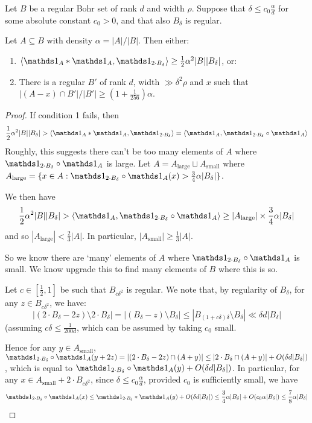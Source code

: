 \documentclass[10pt,a4paper]{article}
\begin{document}
\begin{lemma}
  Let $B$ be a regular Bohr set of rank $d$ and width $\rho$. Suppose that $\delta \leq c_0 \frac{\alpha}{d}$ for some absolute constant $c_0 > 0$, and that also $B_\delta$ is regular.

  Let $A \subseteq B$ with density $\alpha = |A|/|B|$. Then either:
  \begin{enumerate}
    \item $\angle{\one_A \ast \one_A, \one_{2\cdot B_\delta}} \geq \frac12 \alpha^2 |B||B_\delta|$, or:
    \item There is a regular $B'$ of rank $d$, width $\gg \delta^2 \rho$ and $x$ such that $|(A-x)\cap B'|/|B'| \geq (1+\frac{1}{256})\alpha$.
  \end{enumerate}
\end{lemma}
\begin{proof}
  If condition 1 fails, then
  \[\frac12\alpha^2 |B||B_{\delta}| > \angle{\one_A \ast \one_A, \one_{2\cdot B_\delta}} = \angle{\one_A, \one_{2\cdot B_\delta}\circ \one_A}\]
  Roughly, this suggests there can't be too many elements of $A$ where $\one_{2\cdot B_\delta} \circ \one_A$ is large. Let $A = A_{\text{large}}\sqcup A_{\text{small}}$ where $A_{\text{large}} = \{x \in A : \one_{2\cdot B_\delta} \circ \one_A (x) > \frac34 \alpha|B_\delta|\}$.

  We then have
  \[\frac12 \alpha^2 |B||B_\delta| > \angle{\one_A, \one_{2\cdot B_\delta} \circ \one_A} \geq |A_{\text{large}}|\times \frac{3}{4}\alpha |B_\delta|\]
  and so $|A_{\text{large}}| < \frac{2}{3}|A|$. In particular, $|A_{\text{small}}| \geq \frac13 |A|$.

  So we know there are `many' elements of $A$ where $\one_{2\cdot B_\delta}\circ \one_A$ is small. We know upgrade this to find many elements of $B$ where this is so.

  Let $c \in [\frac12, 1]$ be such that $B_{c\delta^2}$ is regular. We note that, by regularity of $B_\delta$, for any $z \in B_{c\delta^2}$, we have:
  \[|(2\cdot B_\delta - 2z)\setminus 2 \cdot B_\delta| = |(B_\delta -z)\setminus B_\delta| \leq |B_{(1+c\delta)\delta} \setminus B_\delta| \ll \delta d |B_\delta|\]
  (assuming $c\delta \leq \frac{1}{200d}$, which can be assumed by taking $c_0$ small.

  Hence for any $y \in A_{\text{small}}$, $\one_{2\cdot B_\delta}\circ \one_A(y+2z) = |(2\cdot B_\delta-2z) \cap (A+y)| \leq |2\cdot B_\delta\cap(A+y)| + O(\delta d |B_\delta|)$, which is equal to $\one_{2\cdot B_\delta} \circ \one_A(y) + O(\delta d|B_\delta|)$. In particular, for any $x \in A_{\text{small}}+2\cdot B_{c\delta^2}$, since $\delta \leq c_0 \frac{\alpha}{d}$, provided $c_0$ is sufficiently small, we have
  \[\one_{2\cdot B_\delta}\circ \one_A(x) \leq \one_{2\cdot B_\delta}\ast \one_A(y) + O(\delta d |B_\delta|) \leq \frac{3}{4}\alpha|B_\delta| + O(c_0\alpha|B_\delta|) \leq \frac78 \alpha|B_\delta|\]


\end{proof}
\end{document}
